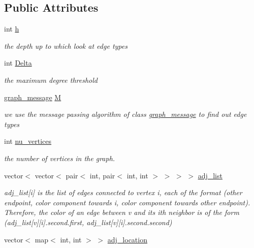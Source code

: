 \subsection*{Public Attributes}
\begin{DoxyCompactItemize}
\item 
int \hyperlink{classcolored__graph_ae27062a4ee59df2670d3a0c81e85a3fa}{h}
\begin{DoxyCompactList}\small\item\em the depth up to which look at edge types \end{DoxyCompactList}\item 
int \hyperlink{classcolored__graph_a5b0e93eb40a20dc815c809dee11edc12}{Delta}
\begin{DoxyCompactList}\small\item\em the maximum degree threshold \end{DoxyCompactList}\item 
\hyperlink{classgraph__message}{graph\+\_\+message} \hyperlink{classcolored__graph_ab72c568fe12f7c849ca6bffb145aec47}{M}
\begin{DoxyCompactList}\small\item\em we use the message passing algorithm of class \hyperlink{classgraph__message}{graph\+\_\+message} to find out edge types \end{DoxyCompactList}\item 
int \hyperlink{classcolored__graph_a90ece8eb1fec52f3f41549ab527c1d5b}{nu\+\_\+vertices}
\begin{DoxyCompactList}\small\item\em the number of vertices in the graph. \end{DoxyCompactList}\item 
vector$<$ vector$<$ pair$<$ int, pair$<$ int, int $>$ $>$ $>$ $>$ \hyperlink{classcolored__graph_a45dce16965079286cf3f41a54a1b2ea4}{adj\+\_\+list}
\begin{DoxyCompactList}\small\item\em adj\+\_\+list\mbox{[}i\mbox{]} is the list of edges connected to vertex i, each of the format (other endpoint, color component towards i, color component towards other endpoint). Therefore, the color of an edge between v and its ith neighbor is of the form (adj\+\_\+list\mbox{[}v\mbox{]}\mbox{[}i\mbox{]}.second.\+first, adj\+\_\+list\mbox{[}v\mbox{]}\mbox{[}i\mbox{]}.second.\+second) \end{DoxyCompactList}\item 
vector$<$ map$<$ int, int $>$ $>$ \hyperlink{classcolored__graph_ad657e7e86bee874d19dbc1765e1edaa7}{adj\+\_\+location}

\end{DoxyCompactItemize}
